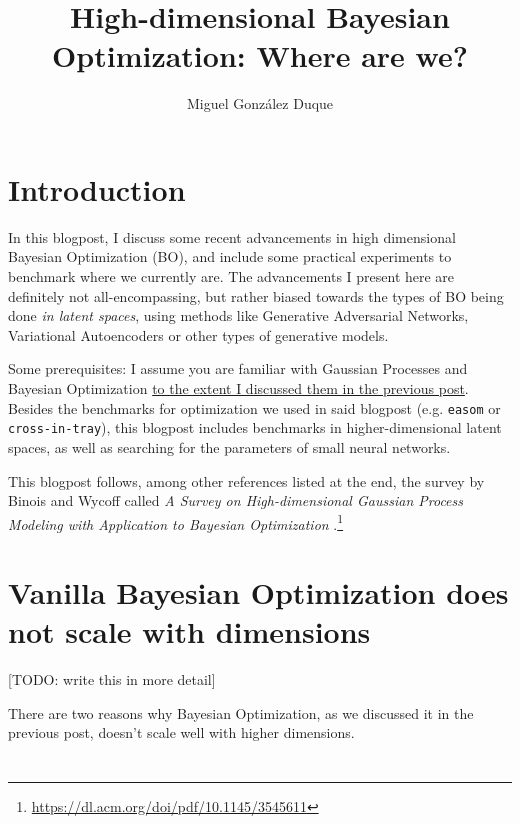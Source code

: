\documentclass{article}
\title{High-dimensional Bayesian Optimization: Where are we?}
\author{Miguel González Duque}
\date{}
\begin{document}
\maketitle

\section{Introduction}

In this blogpost, I discuss some recent advancements in high dimensional Bayesian Optimization (BO), and include some practical experiments to benchmark where we currently are. The advancements I present here are definitely not all-encompassing, but rather biased towards the types of BO being done \textit{in latent spaces}, using methods like Generative Adversarial Networks, Variational Autoencoders or other types of generative models.

Some prerequisites: I assume you are familiar with Gaussian Processes and Bayesian Optimization \href{https://www.miguelgondu.com/blogposts/2023-07-31/intro-to-bo/}{to the extent I discussed them in the previous post}. Besides the benchmarks for optimization we used in said blogpost (e.g. \texttt{easom} or \texttt{cross-in-tray}), this blogpost includes benchmarks in higher-dimensional latent spaces, as well as searching for the parameters of small neural networks.

This blogpost follows, among other references listed at the end, the survey by Binois and Wycoff called \textit{A Survey on High-dimensional Gaussian Process Modeling with Application to Bayesian Optimization} \cite{BinoisWycoff:high-dimensional-bo:2022}.\footnote{\url{https://dl.acm.org/doi/pdf/10.1145/3545611}}

\section{Vanilla Bayesian Optimization does not scale with dimensions}

[TODO: write this in more detail]

There are two reasons why Bayesian Optimization, as we discussed it in the previous post, doesn't scale well with higher dimensions.

\section{}



\end{document}

